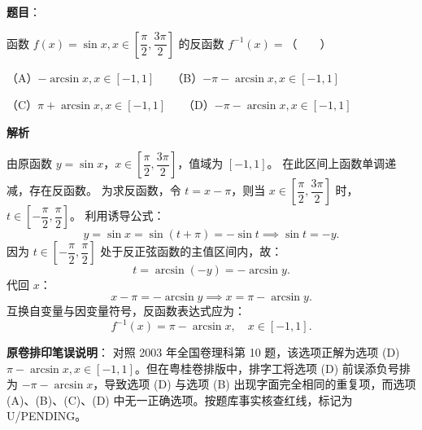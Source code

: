 \begin{answer}

\textbf{题目}：

函数 $f(x) = \sin x, x \in \left[\dfrac{\pi}{2}, \dfrac{3\pi}{2}\right]$ 的反函数 $f^{-1}(x) =$\mbox{（　　）}

（A）$-\arcsin x, x \in [-1, 1]$　　（B）$-\pi - \arcsin x, x \in [-1, 1]$

（C）$\pi + \arcsin x, x \in [-1, 1]$　　（D）$-\pi - \arcsin x, x \in [-1, 1]$

\textbf{解析}

由原函数 $y = \sin x$，$x \in \left[\dfrac{\pi}{2}, \dfrac{3\pi}{2}\right]$，值域为 $[-1, 1]$。
在此区间上函数单调递减，存在反函数。
为求反函数，令 $t = x - \pi$，则当 $x \in \left[\dfrac{\pi}{2}, \dfrac{3\pi}{2}\right]$ 时，$t \in \left[-\dfrac{\pi}{2}, \dfrac{\pi}{2}\right]$。
利用诱导公式：
\nopagebreak[4]
\[y = \sin x = \sin(t + \pi) = -\sin t \implies \sin t = -y.\]
因为 $t \in \left[-\dfrac{\pi}{2}, \dfrac{\pi}{2}\right]$ 处于反正弦函数的主值区间内，故：
\nopagebreak[4]
\[t = \arcsin(-y) = -\arcsin y.\]
代回 $x$：
\nopagebreak[4]
\[x - \pi = -\arcsin y \implies x = \pi - \arcsin y.\]
互换自变量与因变量符号，反函数表达式应为：
\nopagebreak[4]
\[f^{-1}(x) = \pi - \arcsin x, \quad x \in [-1, 1].\]

\textbf{原卷排印笔误说明}：
对照 2003 年全国卷理科第 10 题，该选项正解为选项 (D) $\pi - \arcsin x, x \in [-1, 1]$。但在粤桂卷排版中，排字工将选项 (D) 前误添负号排为 $-\pi - \arcsin x$，导致选项 (D) 与选项 (B) 出现字面完全相同的重复项，而选项 (A)、(B)、(C)、(D) 中无一正确选项。按题库事实核查红线，标记为 U/PENDING。


\end{answer}
